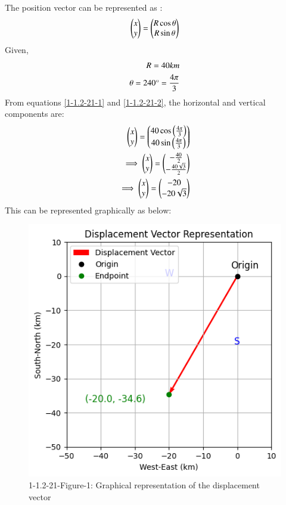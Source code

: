 \documentclass[journal]{IEEEtran}
\numberwithin{equation}{enumi}
\begin{document}
The position vector can be represented as :
\begin{align}
\begin{pmatrix}x\\y\end{pmatrix} =\begin{pmatrix}R\cos\theta\\
 R\sin\theta\end{pmatrix}\label{1-1.2-21-1}
\end{align}
Given,
\begin{align}
R =40 km\label{1-1.2-21-2}\\
\theta = 240\degree=\frac{4\pi}{3}\label{1-1.2-21-3}
\end{align}
From  equations \eqref{1-1.2-21-1} and \eqref{1-1.2-21-2}, the horizontal and vertical components are:
\begin{align}
\begin{pmatrix}x \\ y\end{pmatrix}=\begin{pmatrix}40\cos\left(\frac{4\pi}{3}\right)\\
40\sin\left(\frac{4\pi}{3}\right)\\\end{pmatrix}\\
 \implies
 \begin{pmatrix}x\\y\end{pmatrix}=\begin{pmatrix}-\frac{40}{2}\\-\frac{40\sqrt{3}}{2}\end{pmatrix}\\
 \implies
 \begin{pmatrix}x\\y\end{pmatrix}=\begin{pmatrix}-20\\-20\sqrt{3}\end{pmatrix}
\end{align}
 This can be represented graphically as below:
\begin{figure}[h!]
   \centering
   \includegraphics[width=0.5\columnwidth]{figs/fig.png}
   \caption*{1-1.2-21-Figure-1: Graphical representation of the displacement vector}
   \label{1-1.2-21-Figure-1}
\end{figure}
\end{document}
